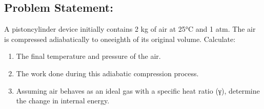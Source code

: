 \documentclass[letterpaper,10pt,english]{jupyterBook}
\begin{document}
\subsection{Problem Statement:}
\label{\detokenize{notebooks/Chapter4/Adiabatic_Compression_Problem_4:problem-statement}}
\sphinxAtStartPar
A piston\sphinxhyphen{}cylinder device initially contains 2 kg of air at 25°C and 1 atm.
The air is compressed adiabatically to one\sphinxhyphen{}eighth of its original volume.
Calculate:
\begin{enumerate}
%
\item {} 
\sphinxAtStartPar
The final temperature and pressure of the air.

\item {} 
\sphinxAtStartPar
The work done during this adiabatic compression process.

\item {} 
\sphinxAtStartPar
Assuming air behaves as an ideal gas with a specific heat ratio (γ), determine the change in internal energy.

\end{enumerate}
\end{document}
